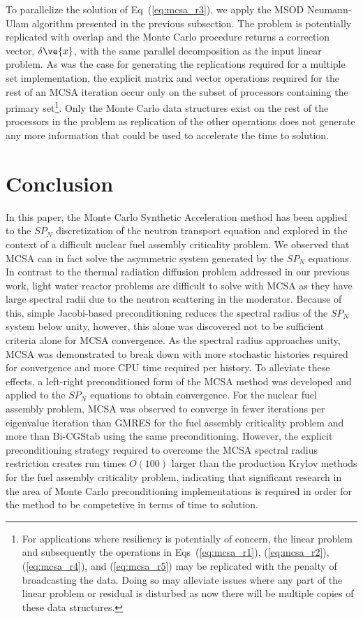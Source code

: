 \documentclass[letterpaper,11pt]{article}
\begin{document}
To parallelize the solution of Eq~(\ref{eq:mcsa_r3}), we apply the
MSOD Neumann-Ulam algorithm presented in the previous subsection. The
problem is potentially replicated with overlap and the Monte Carlo
procedure returns a correction vector, $\delta \ve{x}$, with the same
parallel decomposition as the input linear problem. As was the case
for generating the replications required for a multiple set
implementation, the explicit matrix and vector operations required for
the rest of an MCSA iteration occur only on the subset of processors
containing the primary set\footnote{For applications where resiliency
  is potentially of concern, the linear problem and subsequently the
  operations in Eqs~(\ref{eq:mcsa_r1}), (\ref{eq:mcsa_r2}),
  (\ref{eq:mcsa_r4}), and (\ref{eq:mcsa_r5}) may be replicated with
  the penalty of broadcasting the data. Doing so may alleviate issues
  where any part of the linear problem or residual is disturbed as now
  there will be multiple copies of these data structures.}. Only the
Monte Carlo data structures exist on the rest of the processors in the
problem as replication of the other operations does not generate any
more information that could be used to accelerate the time to
solution.

\section{Conclusion}
\label{sec:conclusion}

In this paper, the Monte Carlo Synthetic Acceleration method has been
applied to the $SP_N$ discretization of the neutron transport equation
and explored in the context of a difficult nuclear fuel assembly
criticality problem. We observed that MCSA can in fact solve the
asymmetric system generated by the $SP_N$ equations. In contrast to
the thermal radiation diffusion problem addressed in our previous
work, light water reactor problems are difficult to solve with MCSA as
they have large spectral radii due to the neutron scattering in the
moderator. Because of this, simple Jacobi-based preconditioning
reduces the spectral radius of the $SP_N$ system below unity, however,
this alone was discovered not to be sufficient criteria alone for MCSA
convergence. As the spectral radius approaches unity, MCSA was
demonstrated to break down with more stochastic histories required for
convergence and more CPU time required per history. To alleviate these
effects, a left-right preconditioned form of the MCSA method was
developed and applied to the $SP_N$ equations to obtain
convergence. For the nuclear fuel assembly problem, MCSA was observed
to converge in fewer iterations per eigenvalue iteration than GMRES
for the fuel assembly criticality problem and more than Bi-CGStab
using the same preconditioning. However, the explicit preconditioning
strategy required to overcome the MCSA spectral radius restriction
creates run times $O(100)$ larger than the production Krylov methods
for the fuel assembly criticality problem, indicating that significant
research in the area of Monte Carlo preconditioning implementations is
required in order for the method to be competetive in terms of time to
solution.

\pagebreak
 

\end{document}
